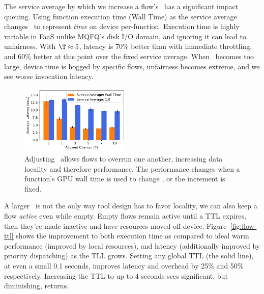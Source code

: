 The service average by which we increase a flow's \VT~has a significant impact queuing.
Using function execution time (Wall Time) as the service average changes \VT~to represent \emph{time} on device per-function.
Execution time is highly variable in FaaS unlike MQFQ's disk I/O domain, and ignoring it can lead to unfairness.
With $\T \approx 5$, latency is 70\% better than with immediate throttling, and 60\% better at this point over the fixed service average.
When \T~becomes too large, device time is hogged by specific flows, unfairness becomes extreme, and we see worse invocation latency.

\begin{figure}
  \includegraphics[width=0.47\textwidth]{../graphs/unfairness/25.7/e2e_sec.pdf}
  \vspace*{\captionspace}
  \caption{Adjusting \T~allows flows to overrun one another, increasing data locality and therefore performance.
  The performance changes when a function's GPU wall time is used to change \VT, or the increment is fixed.}
    \label{fig:unfairness-queue}
    \vspace{-0.4cm}
\end{figure}

A larger \T~is not the only way tool design has to favor locality, we can also keep a flow \emph{active} even while empty.
Empty flows remain active until a TTL expires, then they're made inactive and have resources moved off device.
Figure~\ref{fig:flow-ttl} shows the improvement to both execution time as compared to ideal warm performance (improved by local resources), and latency (additionally improved by priority dispatching) as the TLL grows.
Setting any global TTL (the solid line), at even a small 0.1 seconds, improves latency and overhead by 25\% and 50\% respectively.
Increasing the TTL to up to 4 seconds sees significant, but diminishing, returns.

